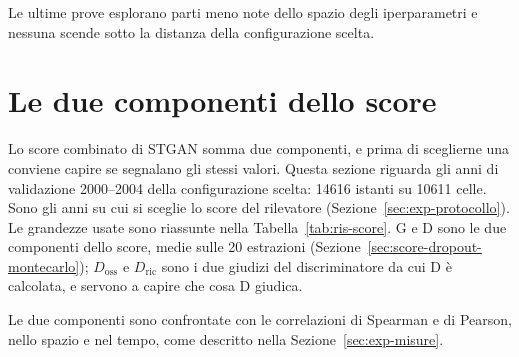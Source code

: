 Le ultime prove esplorano parti meno note dello spazio degli iperparametri e nessuna scende sotto la distanza della configurazione scelta.

\section{Le due componenti dello score}
\label{sec:ris-correlazione-spaziale}

Lo score combinato di STGAN somma due componenti, e prima di sceglierne una conviene capire se segnalano gli stessi valori. Questa sezione riguarda gli anni di validazione 2000--2004 della configurazione scelta: 14616 istanti su 10611 celle. Sono gli anni su cui si sceglie lo score del rilevatore (Sezione~\ref{sec:exp-protocollo}). Le grandezze usate sono riassunte nella Tabella~\ref{tab:ris-score}. G e D sono le due componenti dello score, medie sulle 20 estrazioni (Sezione~\ref{sec:score-dropout-montecarlo}); $D_{\mathrm{oss}}$ e $D_{\mathrm{ric}}$ sono i due giudizi del discriminatore da cui D è calcolata, e servono a capire che cosa D giudica.

Le due componenti sono confrontate con le correlazioni di Spearman e di Pearson, nello spazio e nel tempo, come descritto nella Sezione~\ref{sec:exp-misure}.

